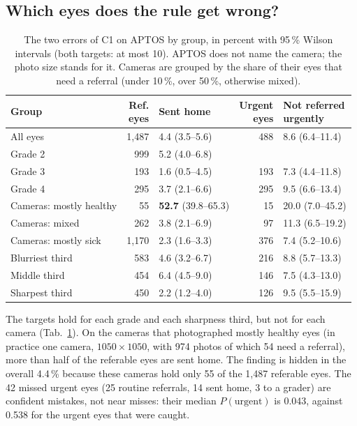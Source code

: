 \documentclass[10pt,twocolumn,letterpaper]{article}
\newcommand{\pct}{\,\%}
\begin{document}
\subsection{Which eyes does the rule get wrong?}\label{sec:errors}
\begin{table}[t]\centering\small
\begin{adjustbox}{max width=\linewidth}\begin{tabular}{@{}lrlrl@{}}\toprule
Group & \shortstack{Ref.\\eyes} & Sent home & \shortstack{Urgent\\eyes} & \shortstack{Not referred\\urgently}\\\midrule
All eyes & 1,487 & 4.4 (3.5--5.6) & 488 & 8.6 (6.4--11.4)\\
Grade 2 & 999 & 5.2 (4.0--6.8) & & \\
Grade 3 & 193 & 1.6 (0.5--4.5) & 193 & 7.3 (4.4--11.8)\\
Grade 4 & 295 & 3.7 (2.1--6.6) & 295 & 9.5 (6.6--13.4)\\
Cameras: mostly healthy & 55 & \textbf{52.7} (39.8--65.3) & 15 & 20.0 (7.0--45.2)\\
Cameras: mixed & 262 & 3.8 (2.1--6.9) & 97 & 11.3 (6.5--19.2)\\
Cameras: mostly sick & 1,170 & 2.3 (1.6--3.3) & 376 & 7.4 (5.2--10.6)\\
Blurriest third & 583 & 4.6 (3.2--6.7) & 216 & 8.8 (5.7--13.3)\\
Middle third & 454 & 6.4 (4.5--9.0) & 146 & 7.5 (4.3--13.0)\\
Sharpest third & 450 & 2.2 (1.2--4.0) & 126 & 9.5 (5.5--15.9)\\\bottomrule
\end{tabular}\end{adjustbox}
\caption{The two errors of C1 on APTOS by group, in percent with 95\pct{} Wilson intervals (both targets: at most 10). APTOS does not name the camera; the photo size stands for it. Cameras are grouped by the share of their eyes that need a referral (under 10\pct, over 50\pct, otherwise mixed).}\label{tab:errors}
\end{table}
The targets hold for each grade and each sharpness third, but not for each camera (Tab.~\ref{tab:errors}). On the cameras that photographed mostly healthy eyes (in practice one camera, $1050{\times}1050$, with 974 photos of which 54 need a referral), more than half of the referable eyes are sent home. The finding is hidden in the overall 4.4\pct{} because these cameras hold only 55 of the 1,487 referable eyes. The 42 missed urgent eyes (25 routine referrals, 14 sent home, 3 to a grader) are confident mistakes, not near misses: their median $P(\text{urgent})$ is 0.043, against 0.538 for the urgent eyes that were caught.
\end{document}
